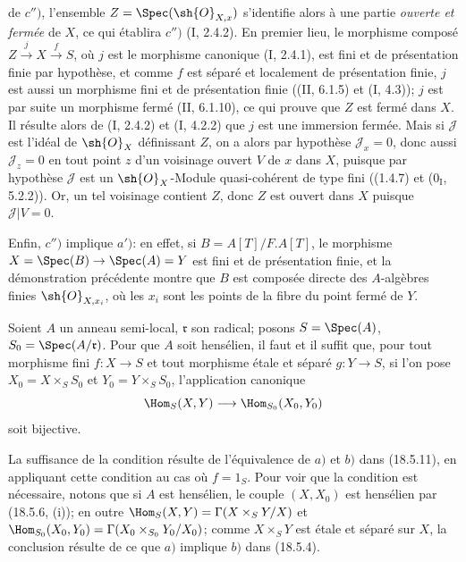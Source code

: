 
de $c'')$, l'ensemble $Z=\Spec(\sh{O}_{X,x})$ s'identifie alors à une partie \emph{ouverte et fermée} de $X$, ce qui établira $c'')$ (I, 2.4.2). En premier lieu, le morphisme composé $Z\xrightarrow{j}X\xrightarrow{f}S$, où $j$ est le morphisme canonique (I, 2.4.1), est fini et de présentation finie par hypothèse, et comme $f$ est séparé et localement de présentation finie, $j$ est aussi un morphisme fini et de présentation finie ((II, 6.1.5) et (I, 4.3)); $j$ est par suite un morphisme fermé (II, 6.1.10), ce qui prouve que $Z$ est fermé dans $X$. Il résulte alors de (I, 2.4.2) et (I, 4.2.2) que $j$ est une immersion fermée. Mais si $\mathscr J$ est l'idéal de $\sh{O}_X$ définissant $Z$, on a alors par hypothèse $\mathscr J_x=0$, donc aussi $\mathscr J_z=0$ en tout point $z$ d'un voisinage ouvert $V$ de $x$ dans $X$, puisque par hypothèse $\mathscr J$ est un $\sh{O}_X$-Module quasi-cohérent de type fini ((1.4.7) et ($0_{\mathrm I}$, 5.2.2)). Or, un tel voisinage contient $Z$, donc $Z$ est ouvert dans $X$ puisque $\mathscr J|V=0$.

Enfin, $c'')$ implique $a')$: en effet, si $B=A[T]/F.A[T]$, le morphisme $X=\Spec(B)\to\Spec(A)=Y$ est fini et de présentation finie, et la démonstration précédente montre que $B$ est composée directe des $A$-algèbres finies $\sh{O}_{X,x_i}$, où les $x_i$ sont les points de la fibre du point fermé de $Y$.

\begin{corollary}[18.5.12]
\label{IV.18.5.12}
Soient $A$ un anneau semi-local, $\mathfrak r$ son radical; posons $S=\Spec(A)$, $S_0=\Spec(A/\mathfrak r)$. Pour que $A$ soit hensélien, il faut et il suffit que, pour tout morphisme fini $f:X\to S$ et tout morphisme étale et séparé $g:Y\to S$, si l'on pose $X_0=X\times_S S_0$ et $Y_0=Y\times_S S_0$, l'application canonique
\[
  \Hom_S(X,Y)\longrightarrow\Hom_{S_0}(X_0,Y_0)
\]
soit bijective.
\end{corollary}

La suffisance de la condition résulte de l'équivalence de $a)$ et $b)$ dans (18.5.11), en appliquant cette condition au cas où $f=1_S$. Pour voir que la condition est nécessaire, notons que si $A$ est hensélien, le couple $(X,X_0)$ est hensélien par (18.5.6, (i)); en outre $\Hom_S(X,Y)=\Gamma(X\times_S Y/X)$ et $\Hom_{S_0}(X_0,Y_0)=\Gamma(X_0\times_{S_0}Y_0/X_0)$; comme $X\times_S Y$ est étale et séparé sur $X$, la conclusion résulte de ce que $a)$ implique $b)$ dans (18.5.4).

